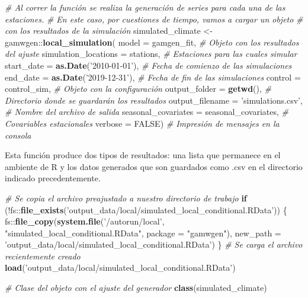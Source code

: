 \documentclass[
  12pt]{article}
\newenvironment{Shaded}{}{}
\newcommand{\CommentTok}[1]{\textcolor[rgb]{0.38,0.63,0.69}{\textit{#1}}}
\newcommand{\ControlFlowTok}[1]{\textcolor[rgb]{0.00,0.44,0.13}{\textbf{#1}}}
\newcommand{\DataTypeTok}[1]{\textcolor[rgb]{0.56,0.13,0.00}{#1}}
\newcommand{\KeywordTok}[1]{\textcolor[rgb]{0.00,0.44,0.13}{\textbf{#1}}}
\newcommand{\NormalTok}[1]{#1}
\newcommand{\OperatorTok}[1]{\textcolor[rgb]{0.40,0.40,0.40}{#1}}
\newcommand{\OtherTok}[1]{\textcolor[rgb]{0.00,0.44,0.13}{#1}}
\newcommand{\StringTok}[1]{\textcolor[rgb]{0.25,0.44,0.63}{#1}}
\begin{document}
\begin{Shaded}
\begin{Highlighting}[]
\CommentTok{# Al correr la función se realiza la generación de series para cada una de las estaciones. }
\CommentTok{# En este caso, por cuestiones de tiempo, vamos a cargar un objeto }
\CommentTok{# con los resultados de la simulación }
\NormalTok{simulated_climate <-}\StringTok{ }\NormalTok{gamwgen}\OperatorTok{::}\KeywordTok{local_simulation}\NormalTok{(}
  \DataTypeTok{model =}\NormalTok{ gamgen_fit, }
  \CommentTok{# Objeto con los resultados del ajuste}
  \DataTypeTok{simulation_locations =}\NormalTok{ stations, }
  \CommentTok{# Estaciones para las cuales simular}
  \DataTypeTok{start_date =} \KeywordTok{as.Date}\NormalTok{(}\StringTok{'2010-01-01'}\NormalTok{), }
  \CommentTok{# Fecha de comienzo de las simulaciones}
  \DataTypeTok{end_date =} \KeywordTok{as.Date}\NormalTok{(}\StringTok{'2019-12-31'}\NormalTok{), }
  \CommentTok{# Fecha de fin de las simulaciones}
  \DataTypeTok{control =}\NormalTok{ control_sim, }
  \CommentTok{# Objeto con la configuración}
  \DataTypeTok{output_folder =} \KeywordTok{getwd}\NormalTok{(), }
  \CommentTok{# Directorio donde se guardarán los resultados}
  \DataTypeTok{output_filename =} \StringTok{'simulations.csv'}\NormalTok{, }
  \CommentTok{# Nombre del archivo de salida}
  \DataTypeTok{seasonal_covariates =}\NormalTok{ seasonal_covariates, }
  \CommentTok{# Covariables estacionales}
  \DataTypeTok{verbose =} \OtherTok{FALSE}\NormalTok{) }
  \CommentTok{# Impresión de mensajes en la consola}
\end{Highlighting}
\end{Shaded}

Esta función produce dos tipos de resultados: una lista que permanece en el ambiente de R y los datos generados que son guardados como .csv en el directorio indicado precedentemente.

\begin{Shaded}
\begin{Highlighting}[]
\CommentTok{# Se copia el archivo preajustado a nuestro directorio de trabajo}
\ControlFlowTok{if}\NormalTok{ (}\OperatorTok{!}\NormalTok{fs}\OperatorTok{::}\KeywordTok{file_exists}\NormalTok{(}\StringTok{'output_data/local/simulated_local_conditional.RData'}\NormalTok{)) \{}
\NormalTok{  fs}\OperatorTok{::}\KeywordTok{file_copy}\NormalTok{(}\KeywordTok{system.file}\NormalTok{(}\StringTok{'/autorun/local'}\NormalTok{, }\StringTok{"simulated_local_conditional.RData"}\NormalTok{, }
                            \DataTypeTok{package =} \StringTok{"gamwgen"}\NormalTok{),}
                \DataTypeTok{new_path =} \StringTok{'output_data/local/simulated_local_conditional.RData'}\NormalTok{)}
\NormalTok{\}  }
\CommentTok{# Se carga el archivo recientemente creado}
\KeywordTok{load}\NormalTok{(}\StringTok{'output_data/local/simulated_local_conditional.RData'}\NormalTok{)}

\CommentTok{# Clase del objeto con el ajuste del generador}
\KeywordTok{class}\NormalTok{(simulated_climate)}
\end{Highlighting}
\end{Shaded}
\end{document}
